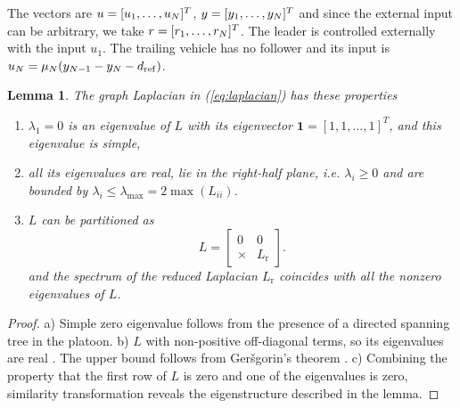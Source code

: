 \documentclass[technote, 10pt, twoside]{IEEEtran}
\newcommand{\weightGain}{\mu}
\newcommand{\systemOutput}{y}
\newcommand{\systemOutputVect}{{\systemOutput}}
\newcommand{\wn}{i}
\newcommand{\numVeh}{N}
\newcommand{\lapl}{{L}}
\newcommand{\redLapl}{{\lapl_\mathrm{r}}}
\newcommand{\spatEig}{\lambda} \newcommand{\spatEigWn}{\lambda_\wn}
\newcommand{\spatEigMax}{\spatEig_{\max}}
\newcommand{\inpVect}{{\inp}}
\theoremstyle{plain}
\newtheorem{lemma}{Lemma}
\theoremstyle{definition}
\theoremstyle{assump}
\begin{document}
The vectors are $\totalInput=[\totalInput_1, \ldots,\totalInput_\numVeh]^T$,
$\systemOutputVect=[\pos_1, \ldots,\pos_\numVeh]^T$ and since the external input
can be arbitrary, we take $\inpVect=[\inp_1,\ldots,\inp_\numVeh]^T$. The leader
is controlled externally with the input $u_1$. The trailing vehicle has no
follower and its input is $\totalInput_\numVeh = \weightGain_\numVeh(\pos_{\numVeh-1}-\pos_{\numVeh}-\dreference)$.

\begin{lemma}
	The graph Laplacian in (\ref{eq:laplacian}) has these properties
	\begin{enumerate}
	  \item[a)] $\spatEig_1=0$ is an eigenvalue of $\lapl$ with its eigenvector
	  $\mathbf{1}=[1,1,\ldots,1]^T$, and this eigenvalue is simple,
	  \item[b)] all its eigenvalues are real, lie in the right-half plane, i.e.
	  $\spatEigWn \geq 0$ and are bounded by $\spatEig_i \leq \spatEigMax = 2\max(\lapl_{ii})$.
	  \item[c)] $\lapl$ can be partitioned as
	  \begin{equation}	
	 \lapl = \left[\begin{array}{c|c}
	                0 & 0\\
	                \hline	    
\times & {\redLapl}
	               \end{array}\right].
	               \label{eq:decompLapl}
	\end{equation}
	and the spectrum of the reduced Laplacian $\redLapl$ coincides with all the
	nonzero eigenvalues of $\lapl$.
	\end{enumerate}
	\label{lem:lapProp}
\end{lemma} 
\begin{proof}
a) Simple zero eigenvalue follows from the presence of a directed spanning tree
in the platoon. b) $\lapl$  with non-positive off-diagonal terms, so its eigenvalues
are real \cite[Lem.
0.1.1]{Fallat2011}.
The upper bound follows from Ger\v{s}gorin's theorem \cite[Thm.
6.1.1]{Horn1996}. c) Combining the property that the first row of $\lapl$ is
zero and one of the eigenvalues is zero, similarity transformation reveals the
eigenstructure described in the lemma.
\end{proof}	
\end{document}
